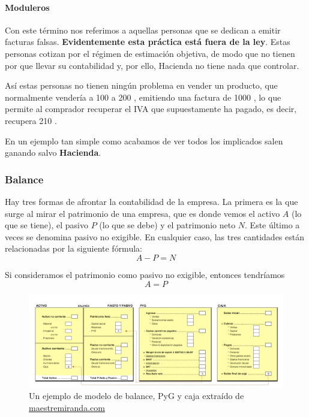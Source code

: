 \documentclass[nochap,palatino,shortheader]{apuntes}
\newcommand{\study}[1]{#1} \newcommand{\substudy}[1]{#1}
\begin{document}
\paragraph{Moduleros}

Con este término nos referimos a aquellas personas que se dedican a emitir facturas falsas. \textbf{Evidentemente esta práctica está fuera de la ley}. Estas personas cotizan por el régimen de estimación objetiva, de modo que no tienen por que llevar su contabilidad y, por ello, Hacienda no tiene nada que controlar.

Así estas personas no tienen ningún problema en vender un producto, que normalmente vendería a 100  a 200 \texteuro, emitiendo una factura de 1000 \texteuro, lo que permite al comprador recuperar el IVA que supuestamente ha pagado, es decir, recupera 210 \texteuro.

En un ejemplo tan simple como acabamos de ver todos los implicados salen ganando salvo \textbf{Hacienda}.

\subsubsection{Balance}

Hay tres formas de afrontar la contabilidad de la empresa. 
La primera es la que surge al mirar el patrimonio de una empresa, que es donde vemos el \study{activo} $A$ (\substudy{lo que se tiene}), el \study{pasivo} $P$ (\substudy{lo que se debe}) y el \study{patrimonio neto} $N$. Este último a veces se denomina pasivo no exigible. 
En cualquier caso, las tres cantidades están relacionadas por la siguiente fórmula:
\[ A - P = N\]

Si consideramos el patrimonio como pasivo no exigible, entonces tendríamos \[ A = P \]


\begin{figure}[hbtp]
\centering
\includegraphics[width=\textwidth]{img/Balance_PyG_Caja.png}
\caption{Un ejemplo de modelo de balance, PyG y caja extraído de \href{http://maestremiranda.com/techdir/wp-content/uploads/2015/10/EF0.-Bal_PYG_Caja.pdf}{maestremiranda.com}}
\label{fig:BalancePyGCaja}
\end{figure}
\end{document}
